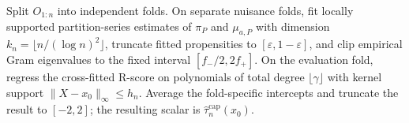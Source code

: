 Split \(O_{1:n}\) into independent folds. On separate nuisance folds, fit locally supported partition-series estimates of \(\pi_P\) and \(\mu_{a,P}\) with dimension \(k_n=\lfloor n/(\log n)^2\rfloor\), truncate fitted propensities to \([\varepsilon,1-\varepsilon]\), and clip empirical Gram eigenvalues to the fixed interval \([f_{-}/2,2f_{+}]\). On the evaluation fold, regress the cross-fitted R-score on polynomials of total degree \(\lfloor\gamma\rfloor\) with kernel support \(\lVert X-x_0\rVert_\infty\le h_n\). Average the fold-specific intercepts and truncate the result to \([-2,2]\); the resulting scalar is \(\widehat{\tau}^{\mathrm{cap}}_n(x_0)\).